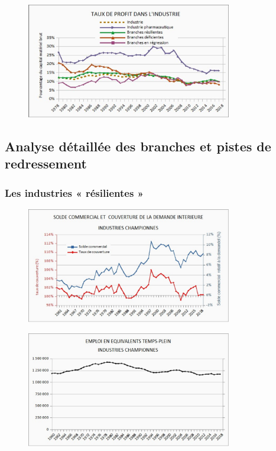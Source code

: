 \documentclass[a4paper]{article}
\begin{document}
\begin{figure}[H]
    \centering
    \includegraphics*[width=0.8\textwidth]{images/profit}
    \label{fig:profit}
\end{figure}

\subsection{Analyse détaillée des branches et pistes de redressement}
\subsubsection{Les industries « résilientes »}

\begin{figure}[H]
    \centering
    \includegraphics*[width=0.8\textwidth]{images/solde2}
    \label{fig:solde2}
\end{figure}


\begin{figure}[H]
    \centering
    \includegraphics*[width=0.8\textwidth]{images/etp2}
    \label{fig:etp2}
\end{figure}
\end{document}
